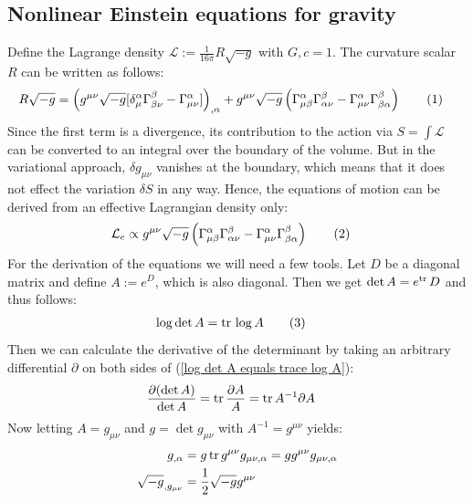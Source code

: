 \documentclass[a4paper,12pt]{article}
\newcommand\numberthis{\addtocounter{equation}{1}\tag{\theequation}}
\newcommand{\kla}{}
\newcommand{\tecxt}{}
\begin{document}
\subsection{Nonlinear Einstein equations for gravity}
Define the Lagrange density $\mathcal{L}:=\frac{1}{16\pi}R\sqrt{-g}$ with $G,c=1$. The curvature scalar $R$ can be written as follows:
\begin{align*}
R\sqrt{-g}&=\kla\left( {g^{\mu\nu}\sqrt{-g}[\delta^\alpha_\mu\Gamma^\beta_{\beta\nu}-\Gamma^\alpha_{\mu\nu} ]} \right)_{,\alpha}+g^{\mu\nu}\sqrt{-g}\kla\left( {\Gamma^\alpha_{\mu\beta}\Gamma^\beta_{\alpha\nu}-\Gamma^\alpha_{\mu\nu}\Gamma^\beta_{\beta\alpha}} \right)\numberthis\label{Curvature Scalar}
\end{align*}
Since the first term is a divergence, its contribution to the action via $S=\int\mathcal{L}$ can be converted to an integral over the boundary of the volume. But in the variational approach, $\delta g_{\mu\nu}$ vanishes at the boundary, which means that it does not effect the variation $\delta S$ in any way. Hence, the equations of motion can be derived from an effective Lagrangian density only:
\begin{align*}
\mathcal{L}_e&\propto g^{\mu\nu}\sqrt{-g}\kla\left( {\Gamma^\alpha_{\mu\beta}\Gamma^\beta_{\alpha\nu}-\Gamma^\alpha_{\mu\nu}\Gamma^\beta_{\beta\alpha}} \right)\numberthis\label{Effective Lagrange density nonlinear gravity}
\end{align*}
For the derivation of the equations we will need a few tools. Let $D$ be a diagonal matrix and define $A:=e^D$, which is also diagonal. Then we get $\det A=e^{\tecxt\text{tr\,}}D$ and thus follows:
\begin{align*}
\log\det A&=\tecxt\text{tr\,}\log A\numberthis\label{log det A equals trace log A}
\end{align*}
Then we can calculate the derivative of the determinant by taking an arbitrary differential $\partial$ on both sides of (\ref{log det A equals trace log A}):
\begin{align*}
\frac{\partial (\det A)}{\det A}&=\tecxt\text{tr\,}\frac{\partial A}{A}=\tecxt\text{tr\,}A^{-1}\partial A
\end{align*}
Now letting $A=g_{\mu\nu}$ and $g=\det g_{\mu\nu}$ with $A^{-1}=g^{\mu\nu}$ yields:
\begin{align*}
g_{,\alpha}&=g\,\tecxt\text{tr\,}g^{\mu\nu}g_{\mu\nu,\alpha}=gg^{\mu\nu}g_{\mu\nu,\alpha}\\
\sqrt{-g}_{,g_{\mu\nu}}&=\frac{1}{2}\sqrt{-g} g^{\mu\nu}
\end{align*} 
\end{document}
